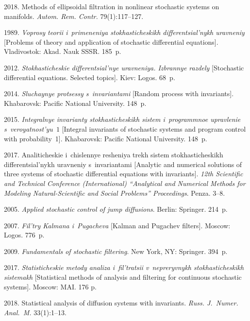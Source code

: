\begin{multicols}{2}
{{\begin{thebibliography}{99}
2018. Methods of ellipsoidal filtration in nonlinear stochastic systems on manifolds. 
\textit{Autom. Rem. Contr.} 79(1):117--127.

 1989. \textit{Voprosy teorii i~primeneniya sto\-kha\-sti\-che\-skikh 
differentsial'nykh uravneniy} [Problems of theory and application 
of stochastic differential equations]. Vladivostok: Akad. Nauk SSSR. 185~p.

 2012. \textit{Stokhasticheskie differentsial'nye uravneniya. 
Izbrannye razdely} [Stochastic differential equations. Selected topics]. 
Kiev: Logos. 68~p.

 2014. \textit{Sluchaynye protsessy s~invariantami} 
[Random process with invariants]. Khabarovsk: Pacific National University. 148~p.

 2015. \textit{Integralnye invarianty 
sto\-kha\-sti\-che\-skikh sistem 
i~programmnoe upravlenie s~ve\-ro\-yat\-nost'yu~$1$} 
[Integral invariants of stochastic systems and program control with probability~1]. 
Khabarovsk: Pacific National University. 148~p.

 2017. Analiticheskie i~chislennye resheniya trekh 
sistem stokhasticheskikh differentsial'nykh uravneniy s~invariantami 
[Analytic and numerical solutions of three systems of stochastic differential 
equations with invariants]. 
\textit{12th  Scientific and Technical Conference  (International)
``Analytical and Numerical Methods for Modeling Natural-Scientific and Social Problems''
Proceedings}. Penza. 3--8.

 2005. 
\textit{Applied stochastic control of jump diffusions}. Berlin: Springer. 214~p.

 2007. \textit{Fil'try Kalmana i~Pugacheva} [Kalman and Pugachev filters]. 
Moscow: Logos. 776~p.

 2009. \textit{Fundamentals of stochastic filtering}. 
New York, NY: Springer. 394~p.

 2017. \textit{Statisticheskie metody analiza i~fil'tratsii v~nepreryvnykh 
stokhasticheskikh sistemakh} [Statistical methods of analysis and filtering for 
continuous stochastic systems]. Moscow: MAI. 176 p.

2018. Statistical analysis of diffusion systems with invariants. 
\textit{Russ. J.~Numer. Anal.~M.} 33(1):1--13.
\end{thebibliography}

 }
 }

\end{multicols}

